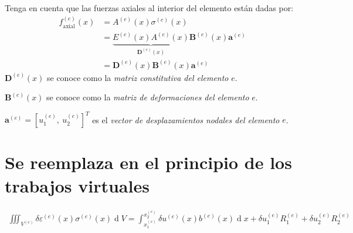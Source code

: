 \documentclass[12pt,landscape,letterpaper]{article}
\newcommand{\ve}[1]{{\boldsymbol{#1}}}
\newcommand{\ma}[1]{{\boldsymbol{#1}}}
\newcommand{\dd}{\operatorname{d} \!}
\begin{document}
Tenga en cuenta que las fuerzas axiales al interior del elemento están dadas por:
\begin{align}
f^{(e)}_{\text{axial}}(x) 
&= A^{(e)}(x) \sigma^{(e)}(x) \\
&= \underbrace{E^{(e)}(x) A^{(e)}(x)}_{\ma{D}^{(e)}(x)} \ma{B}^{(e)}(x) \ve{a}^{(e)} \\
&= \ma{D}^{(e)}(x) \ma{B}^{(e)}(x) \ve{a}^{(e)}
\end{align}
$\ma{D}^{(e)}(x)$ se conoce como la \emph{matriz constitutiva del elemento} $e$.

$\ma{B}^{(e)}(x)$ se conoce como la \emph{matriz de deformaciones del elemento} $e$.

$\ve{a}^{(e)} = [u_1^{(e)},\ u_2^{(e)}]^T$ es el \emph{vector de desplazamientos nodales del elemento} $e$.

\newpage
\section{Se reemplaza en el principio de los trabajos virtuales}
\begin{align}
\iiint_{V^{(e)}} \delta\varepsilon^{(e)}(x) \sigma^{(e)}(x) \dd V = \int_{x_1^{(e)}}^{x_2^{(e)}} \delta u^{(e)}(x) b^{(e)}(x) \dd x + \delta u_1^{(e)} R_1^{(e)} + \delta u_2^{(e)} R_2^{(e)}
\end{align}
\end{document}
